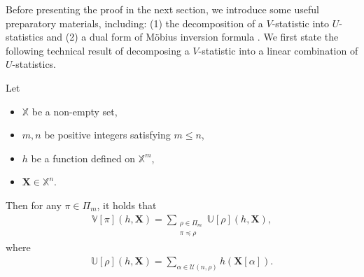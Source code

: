 \documentclass[twoside,11pt]{article}
\newcommand{\mobius}{M\"{o}bius}
\newcommand{\sPi}{\pi}
\newcommand{\uset}{\calU}
\newcommand{\usetnm}[2]{\uset\left(#1,#2\right)}
\newcommand{\ustat}{\mathbb{U}}
\newcommand{\vstat}{\mathbb{V}}
\newcommand{\samplespace}{\bbX}
\newcommand{\partition}{\Pi}
\newcommand{\partitionp}[1]{\partition_{#1}}
\newcommand{\pleq}{\preceq}
\def\bbX{\mathbb{X}}
\def\calU{\mathcal{U}}
\begin{document}
Before presenting the proof in the next section, we introduce some useful preparatory materials, including: (1) the decomposition of a $V$-statistic into $U$-statistics and (2) a dual form of \mobius{} inversion formula \citep{stanley2011enumerative}. We first state the following technical result of decomposing a $V$-statistic into a linear combination of $U$-statistics. 
\begin{lemma}
\label{lem:decomp_v_to_u}
    Let
    \begin{itemize}
        \item $\samplespace$ be a non-empty set, 
        \item $m,n$ be positive integers satisfying $m \leq n$, 
        \item $h$ be a function defined on $\bbX^m$, 
        \item $\bm{X} \in \samplespace^n$. 
    \end{itemize}
    Then for any $\sPi \in \partitionp{m}$, it holds that
    \begin{align*}
        \vstat[\sPi](h, \bm{X}) = \sum_{\substack{
            \rho \in \partitionp{m} \\ \sPi \pleq \rho
        }} \ustat[\rho](h,\bm{X}),
    \end{align*}
    where
     \begin{align*}
       \ustat[\rho](h,\bm{X}) = \sum_{\alpha \in \usetnm{n}{\rho}} h(\bm{X}[\alpha]). 
    \end{align*}
\end{lemma}
\end{document}
